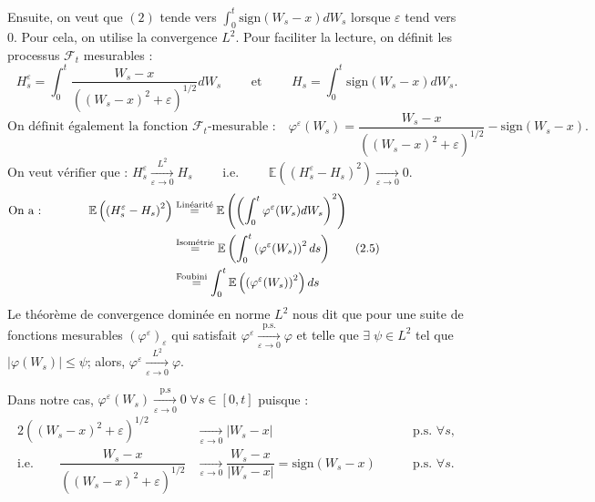 \documentclass[openany]{book}
\makeatletter
\newcommand{\F}{\mathscr{F}}
\newcommand{\E}{\mathbb{E}}
\newcommand{\1}{\mathbbm{1}}
\newcommand{\sign}{\text{sign}}
\renewenvironment{proof}[1][\textbf{\textit{Démonstration}}]{%
  \par\pushQED{\qed}%
  \normalfont\topsep6\p@\@plus6\p@\relax
  \trivlist\item[\hskip\labelsep
    #1\@addpunct{.}]\ignorespaces
}{%
  \popQED\endtrivlist\@endpefalse
}
\theoremstyle{thmfont}
\theoremstyle{deffont}
\theoremstyle{thmfont}
\theoremstyle{deffont}
\makeatother
\begin{document}
\begin{proof}
  
  \noindent Ensuite, on veut que $(2)$ tende vers $\int_0^t \sign(W_s-x)dW_s$ lorsque $\varepsilon$ tend vers $0$. Pour cela, on utilise la convergence $L^2$. Pour faciliter la lecture, on définit les processus $\F_t$ mesurables :
  $$H^\varepsilon_s = \int_0^t \dfrac{W_s-x}{((W_s-x)^2 +\varepsilon)^{1/2}}dW_s \qquad\text{ et }\qquad H_s =  \int_0^t \sign(W_s -x)dW_s.$$\vspace{-4mm}
  $$\text{On définit également la fonction $\F_t$-mesurable :}\quad\varphi^\varepsilon(W_s) =  \dfrac{W_s-x}{((W_s-x)^2 +\varepsilon)^{1/2}} - \sign(W_s -x).\qquad\qquad\qquad\qquad\qquad\qquad$$
  $$\text{On veut vérifier que : }H^\varepsilon_s \xrightarrow[\varepsilon \to 0]{L^2} H_s \qquad \text{ i.e. } \qquad \E\left(\left(H^\varepsilon_s - H_s\right)^2\right) \xrightarrow[\varepsilon \to 0]{} 0.\qquad\qquad\qquad\qquad\qquad\qquad$$
\begin{align*}\label{arg:cvL2}
  \text{On a :}\qquad\qquad
  \E\left(\left(H^\varepsilon_s - H_s\right)^2\right) &\overset{\text{Linéarité}}{=} \E \left( \left(\int_0^t\varphi^\varepsilon(W_s)dW_s\right)^2 \right)\qquad\qquad\qquad\qquad\qquad\\
  &\overset{\text{Isométrie}}{=} \E\left( \int_0^t\left( \varphi^\varepsilon(W_s) \right)^2 ds\right) \tag{2.5}\refstepcounter{equation}\\
  &\overset{\text{Foubini}}{\;\;\;=}\int_0^t\E\left( \left(\varphi^\varepsilon(W_s)\right)^2 \right)ds\\
\end{align*}
\noindent Le théorème de convergence dominée en norme $L^2$ nous dit que pour une suite de fonctions mesurables $(\varphi^\varepsilon)_\varepsilon$ qui satisfait $\varphi^\varepsilon \xrightarrow[\varepsilon\to0]{\text{p.s.}}\varphi$ et telle que $\exists\; \psi \in L^2$ tel que $|\varphi(W_s)| \leq \psi$; alors, $\varphi^\varepsilon \xrightarrow[\varepsilon \to 0]{L^2} \varphi.$


\noindent Dans notre cas, $\varphi^\varepsilon(W_s) \xrightarrow[\varepsilon \to 0]{\text{p.s}} 0\;\forall s \in [0,t]$ puisque :
\begin{alignat*}{2}
((W_s-x)^2 +\varepsilon)^{1/2} &\xrightarrow[\varepsilon\to 0]{} |W_s - x| \;\quad&&\text{p.s. } \forall s,\\
\text{i.e.}\qquad \dfrac{W_s-x}{((W_s-x)^2 +\varepsilon)^{1/2}} &\xrightarrow[\varepsilon \to 0]{} \dfrac{W_s-x}{|W_s - x|} = \sign(W_s -x)\quad\;&&\text{p.s. } \forall s.
\end{alignat*}


\end{proof}
\end{document}
